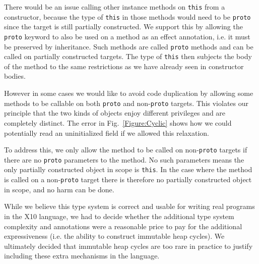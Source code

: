 %

There would be an issue calling other instance methods on \texttt{this} from a
constructor, because the type of \texttt{this} in those methods would need to
be \texttt{proto} since the target is still partially constructed.  We support
this by allowing the \texttt{proto} keyword to also be used on a method as an
effect annotation, i.e. it must be preserved by inheritance.  Such methods are
called \texttt{proto} methods and can be called on partially constructed
targets.  The type of \texttt{this} then subjects the body of the method to the
same restrictions as we have already seen in constructor bodies.

However in some cases we would like to avoid code duplication by allowing some
methods to be callable on both \texttt{proto} and non-\texttt{proto} targets.
This violates our principle that the two kinds of objects enjoy different
privileges and are completely distinct.
The error  in Fig.~\ref{Figure:Cyclic}
shows how we could potentially read an uninitialized field if we allowed this
relaxation.

To address this, we only allow the method to be called on non-\texttt{proto}
targets if there are no \texttt{proto} parameters to the method.  No such
parameters means the only partially constructed object in scope is
\texttt{this}.  In the case where the method is called on a non-\texttt{proto}
target there is therefore no partially constructed object in scope, and no harm
can be done.

While we believe this type system is correct and usable for writing real
programs in the X10 language, we had to decide whether the additional type
system complexity and annotations were a reasonable price to pay for the
additional expressiveness (i.e. the ability to construct immutable heap
cycles).  We ultimately decided that immutable heap cycles are too rare in
practice to justify including these extra mechanisms in the language.
